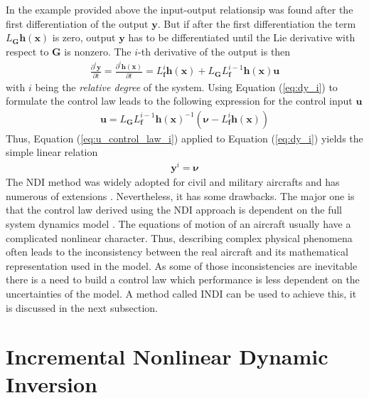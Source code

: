 \documentclass[11pt, a4paper, twoside]{report}
\begin{document}
In the example provided above the input-output relationsip was found after the first differentiation of the output $\bm{y}$. But if after the first differentiation the term $L_{\bm{G}}\bm{h}(\bm{x})$ is zero, output $\bm{y}$ has to be differentiated until the Lie derivative with respect to $\bm{G}$ is nonzero. The $i$-th derivative of the output is then
\begin{equation}
	\begin{split}
		\frac{\partial^i\bm{y}}{\partial t} = \frac{\partial^i\bm{h}(\bm{x})}{\partial t} = L_{\bm{f}}^i \bm{h}(\bm{x}) + L_{\bm{G}} L_{\bm{f}}^{i-1} \bm{h}(\bm{x}) \bm{u}
		\label{eq:dy_i}
	\end{split}
\end{equation}
with $i$ being the \textit{relative degree} of the system. Using Equation (\ref{eq:dy_i}) to formulate the control law leads to the following expression for the control input $\bm{u}$
\begin{equation}
	\begin{split}
		\bm{u} = L_{\bm{G}} L_{\bm{f}}^{i-1} \bm{h}(\bm{x})^{-1} (\bm{\nu} - L_{\bm{f}}^i\bm{h}(\bm{x})) 
		\label{eq:u_control_law_i}
	\end{split}
\end{equation}
Thus, Equation (\ref{eq:u_control_law_i}) applied to Equation (\ref{eq:dy_i}) yields the simple linear relation
\begin{equation}
	\begin{split}
		\bm{y}^i = \bm{\nu}
		\label{eq:lin_relation}
	\end{split}
\end{equation}
The \acrshort{NDI} method was widely adopted for civil and military aircrafts and has numerous of extensions \cite{Horn}. Nevertheless, it has some drawbacks. The major one is that the control law derived using the \acrshort{NDI} approach is dependent on the full system dynamics model \cite{Sieberling}. The equations of motion of an aircraft usually have a complicated nonlinear character. Thus, describing complex physical phenomena often leads to the inconsistency between the real aircraft and its mathematical representation used in the model. As some of those inconsistencies are inevitable there is a need to build a control law which performance is less dependent on the uncertainties of the model. A method called \acrlong{INDI} can be used to achieve this, it is discussed in the next subsection.

\section{Incremental Nonlinear Dynamic Inversion} \label{sec:indi}
\end{document}
